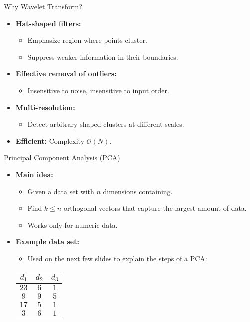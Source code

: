 \begin{frame}{Why Wavelet Transform?}
	\begin{itemize}
		\item \textbf{Hat-shaped filters:}
		      \begin{itemize}
			      \item Emphasize region where points cluster.
			      \item Suppress weaker information in their boundaries.
		      \end{itemize}
		\item \textbf{Effective removal of outliers:}
		      \begin{itemize}
			      \item Insensitive to noise, insensitive to input order.
		      \end{itemize}
		\item \textbf{Multi-resolution:}
		      \begin{itemize}
			      \item Detect arbitrary shaped clusters at different scales.
		      \end{itemize}
		\item \textbf{Efficient:} Complexity $\mathcal{O}(N)$.
	\end{itemize}
\end{frame}

\begin{frame}{Principal Component Analysis (PCA)}
	\begin{itemize}
		\item \textbf{Main idea:}
		      \begin{itemize}
			      \item Given a data set with $n$ dimensions containing.
			      \item Find $k \leq n$ orthogonal vectors that capture the largest
			            amount of data.
			      \item Works only for numeric data.
		      \end{itemize}
		\item \textbf{Example data set:}
		      \begin{itemize}
			      \item Used on the next few slides to explain the steps of a PCA:
		      \end{itemize}
		      \vspace{3mm}
		      \centering
		      \begin{tabular}{|c|c|c|}
			      \hline
			      $d_1$ & $d_2$ & $d_3$
			      \\\hline
			      $23$  & $6$   & $1$
			      \\\hline
			      $9$   & $9$   & $5$
			      \\\hline
			      $17$  & $5$   & $1$
			      \\\hline
			      $3$   & $6$   & $1$
			      \\\hline
		      \end{tabular}
	\end{itemize}
\end{frame}

